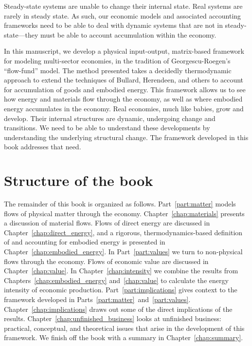 Steady-state systems are unable to change
their internal state.
Real systems are rarely in steady state.
As such, our economic models
and associated accounting frameworks
need to be able to deal with dynamic systems
that are not in steady-state---they must
be able to account accumulation within the economy.

In this manuscript, we develop a physical input-output, 
matrix-based framework for modeling multi-sector economies, 
in the tradition of Georgescu-Roegen's ``flow-fund'' 
model.\cite{G-R1979a, G-R1979b} 
The method presented takes a decidedly thermodynamic approach
to extend the techniques of Bullard, Herendeen, and others 
to account for accumulation of goods
and embodied energy. 
This framework allows us to see how energy 
and materials flow through the economy, 
as well as where embodied energy accumulates in the economy.
Real economies, 
much like babies,
grow and develop.
Their internal structures are dynamic,
undergoing change and transitions.
We need to be able to understand these developments
by understanding the underlying structural change.
The framework developed in this book
addresses that need.

\section{Structure of the book}
\label{sec:structure}

The remainder of this book is organized as follows. 
Part~\ref{part:matter} models flows of physical matter
through the economy.
Chapter~\ref{chap:materials} presents a discussion of material flows.
Flows of direct energy are discussed in Chapter~\ref{chap:direct_energy}, 
and a rigorous, thermodynamics-based definition of and accounting for 
embodied energy is presented in Chapter~\ref{chap:embodied_energy}.
In Part~\ref{part:values} we turn to non-physical flows through the economy. 
Flows of economic value are discussed in Chapter~\ref{chap:value}.
In Chapter~\ref{chap:intensity} we combine the results from 
Chapters~\ref{chap:embodied_energy} and~\ref{chap:value} to
calculate the energy intensity of economic production.
Part~\ref{part:implications} gives context to the framework developed in
Parts~\ref{part:matter}~and~\ref{part:values}.
Chapter~\ref{chap:implications} draws out some of the direct implications
of the results.
Chapter~\ref{chap:unfinished_business} looks at 
unfinished business: practical, conceptual, and theoretical issues
that arise in the development of this framework.
We finish off the book with a summary in Chapter~\ref{chap:summary}.

